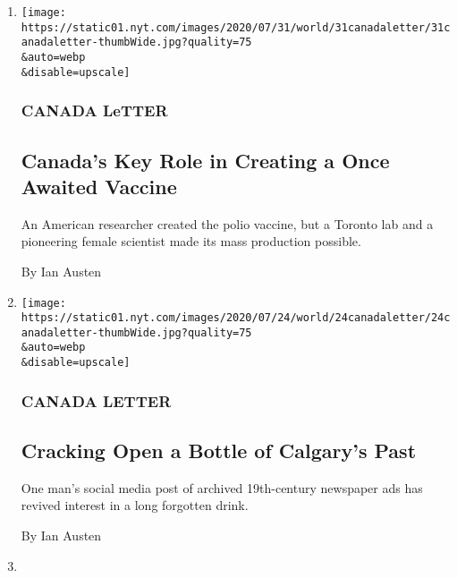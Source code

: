 \begin{enumerate}
\def\labelenumi{\arabic{enumi}.}
\item
  \href{/2020/07/31/world/canada/leone-farrell-chemist.html}{}

  \texttt{[image: https://static01.nyt.com/images/2020/07/31/world/31canadaletter/31canadaletter-thumbWide.jpg?quality=75\\\&auto=webp\\\&disable=upscale]}

  \hypertarget{canada-letter}{%
  \subsubsection{CANADA LeTTER}\label{canada-letter}}

  \hypertarget{canadas-key-role-in-creating-a-once-awaited-vaccine}{%
  \subsection{Canada's Key Role in Creating a Once Awaited
  Vaccine}\label{canadas-key-role-in-creating-a-once-awaited-vaccine}}

  An American researcher created the polio vaccine, but a Toronto lab
  and a pioneering female scientist made its mass production possible.

  By Ian Austen
\item
  \href{/2020/07/24/world/canada/cronk.html}{}

  \texttt{[image: https://static01.nyt.com/images/2020/07/24/world/24canadaletter/24canadaletter-thumbWide.jpg?quality=75\\\&auto=webp\\\&disable=upscale]}

  \hypertarget{canada-letter-1}{%
  \subsubsection{CANADA LETTER}\label{canada-letter-1}}

  \hypertarget{cracking-open-a-bottle-of-calgarys-past}{%
  \subsection{Cracking Open a Bottle of Calgary's
  Past}\label{cracking-open-a-bottle-of-calgarys-past}}

  One man's social media post of archived 19th-century newspaper ads has
  revived interest in a long forgotten drink.

  By Ian Austen
\item
  \href{/2020/07/18/world/canada/bus-crash-glacier-jasper-alberta.html}{}


\end{enumerate}
